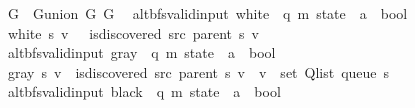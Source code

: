 \begin{isabellebody}
\ \ {\isachardoublequoteopen}G\ {\isasymequiv}\ G{\isachardot}{\kern0pt}union\ G{}\ G{}{\isachardoublequoteclose}\isanewline
\isanewline
{}\isamarkupfalse%
\ {\isacharparenleft}{\kern0pt}\ alt{\isacharunderscore}{\kern0pt}bfs{\isacharunderscore}{\kern0pt}valid{\isacharunderscore}{\kern0pt}input{\isacharparenright}{\kern0pt}\ white\ {\isacharcolon}{\kern0pt}{\isacharcolon}{\kern0pt}\ {\isachardoublequoteopen}{\isacharparenleft}{\kern0pt}{\isacharprime}{\kern0pt}q{\isacharcomma}{\kern0pt}\ {\isacharprime}{\kern0pt}m{\isacharparenright}{\kern0pt}\ state\ {\isasymRightarrow}\ {\isacharprime}{\kern0pt}a\ {\isasymRightarrow}\ bool{\isachardoublequoteclose}\ \isanewline
\ \ {\isachardoublequoteopen}white\ s\ v\ {\isasymequiv}\ {\isasymnot}\ is{\isacharunderscore}{\kern0pt}discovered\ src\ {\isacharparenleft}{\kern0pt}parent\ s{\isacharparenright}{\kern0pt}\ v{\isachardoublequoteclose}\isanewline
\isanewline
{}\isamarkupfalse%
\ {\isacharparenleft}{\kern0pt}\ alt{\isacharunderscore}{\kern0pt}bfs{\isacharunderscore}{\kern0pt}valid{\isacharunderscore}{\kern0pt}input{\isacharparenright}{\kern0pt}\ gray\ {\isacharcolon}{\kern0pt}{\isacharcolon}{\kern0pt}\ {\isachardoublequoteopen}{\isacharparenleft}{\kern0pt}{\isacharprime}{\kern0pt}q{\isacharcomma}{\kern0pt}\ {\isacharprime}{\kern0pt}m{\isacharparenright}{\kern0pt}\ state\ {\isasymRightarrow}\ {\isacharprime}{\kern0pt}a\ {\isasymRightarrow}\ bool{\isachardoublequoteclose}\ \isanewline
\ \ {\isachardoublequoteopen}gray\ s\ v\ {\isasymequiv}\ is{\isacharunderscore}{\kern0pt}discovered\ src\ {\isacharparenleft}{\kern0pt}parent\ s{\isacharparenright}{\kern0pt}\ v\ {\isasymand}\ v\ {\isasymin}\ set\ {\isacharparenleft}{\kern0pt}Q{\isacharunderscore}{\kern0pt}list\ {\isacharparenleft}{\kern0pt}queue\ s{\isacharparenright}{\kern0pt}{\isacharparenright}{\kern0pt}{\isachardoublequoteclose}\isanewline
\isanewline
{}\isamarkupfalse%
\ {\isacharparenleft}{\kern0pt}\ alt{\isacharunderscore}{\kern0pt}bfs{\isacharunderscore}{\kern0pt}valid{\isacharunderscore}{\kern0pt}input{\isacharparenright}{\kern0pt}\ black\ {\isacharcolon}{\kern0pt}{\isacharcolon}{\kern0pt}\ {\isachardoublequoteopen}{\isacharparenleft}{\kern0pt}{\isacharprime}{\kern0pt}q{\isacharcomma}{\kern0pt}\ {\isacharprime}{\kern0pt}m{\isacharparenright}{\kern0pt}\ state\ {\isasymRightarrow}\ {\isacharprime}{\kern0pt}a\ {\isasymRightarrow}\ bool{\isachardoublequoteclose}\ \isanewline

\end{isabellebody}
